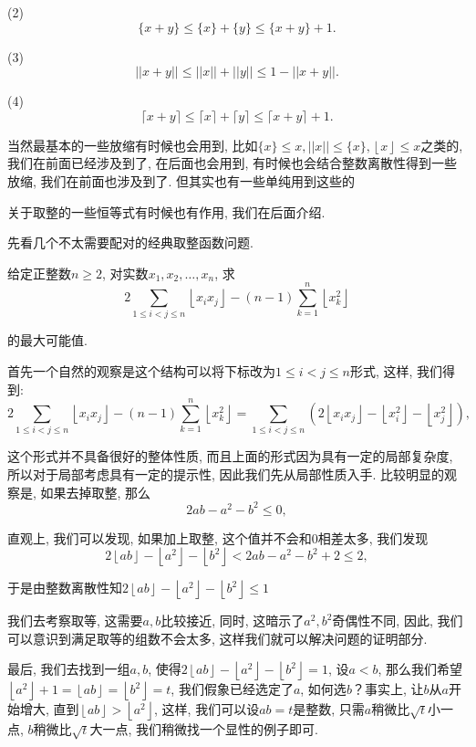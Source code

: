 \documentclass[lang=cn,12pt,thmcnt=section]{elegantbook}
\newcommand{\fl}[1]{\left\lfloor #1\right\rfloor}
\begin{document}
(2)\[\{x+y\}\le \{x\}+\{y\}\le \{x+y\}+1.\]

(3)\[||x+y||\le ||x||+||y||\le 1-||x+y||.\]

(4)\[\lceil x+y\rceil\le \lceil x\rceil+ \lceil y\rceil\le  \lceil x+y\rceil+1.\]


当然最基本的一些放缩有时候也会用到, 比如$\{x\}\le x,||x||\le \{x\},\fl{x}\le x$之类的, 我们在前面已经涉及到了, 在后面也会用到, 有时候也会结合整数离散性得到一些放缩, 我们在前面也涉及到了. 但其实也有一些单纯用到这些的

关于取整的一些恒等式有时候也有作用, 我们在后面介绍. 

先看几个不太需要配对的经典取整函数问题.

\begin{example}
给定正整数$n\ge 2$, 对实数$x_1,x_2,\dots{},x_n$, 求
\[
2\sum_{1\le i<j\le n}\fl{x_ix_j}-(n-1)\sum_{k=1}^n \fl{x_k^2}
\]

的最大可能值.
\end{example}

\begin{analysis}
首先一个自然的观察是这个结构可以将下标改为$1\le i<j\le n$形式, 这样, 我们得到: 
\[
2\sum_{1\le i<j\le n}\fl{x_ix_j}-(n-1)\sum_{k=1}^n \fl{x_k^2}=\sum_{1\le i<j\le n}(2\fl{x_ix_j}-\fl{x_i^2}-\fl{x_j^2}),
\]

这个形式并不具备很好的整体性质, 而且上面的形式因为具有一定的局部复杂度, 所以对于局部考虑具有一定的提示性, 因此我们先从局部性质入手. 比较明显的观察是, 如果去掉取整, 那么
\[
2ab-a^2-b^2\le 0,
\]

直观上, 我们可以发现, 如果加上取整, 这个值并不会和$0$相差太多, 我们发现
\[
2\fl{ab}-\fl{a^2}-\fl{b^2}<2ab-a^2-b^2+2\le 2,
\]

于是由整数离散性知$2\fl{ab}-\fl{a^2}-\fl{b^2}\le 1$

我们去考察取等, 这需要$a,b$比较接近, 同时, 这暗示了${a^2},{b^2}$奇偶性不同, 因此, 我们可以意识到满足取等的组数不会太多, 这样我们就可以解决问题的证明部分.

最后, 我们去找到一组$a,b$, 使得$2\fl{ab}-\fl{a^2}-\fl{b^2}= 1$, 设$a<b$, 那么我们希望$\fl{a^2}+1=\fl{ab}=\fl{b^2}=t$, 我们假象已经选定了$a$, 如何选$b$？事实上, 让$b$从$a$开始增大, 直到$\fl{ab}>\fl{a^2}$, 这样, 我们可以设$ab=t$是整数, 只需$a$稍微比$\sqrt{t}$小一点, $b$稍微比$\sqrt{t}$大一点, 我们稍微找一个显性的例子即可.
\end{analysis}
\end{document}
